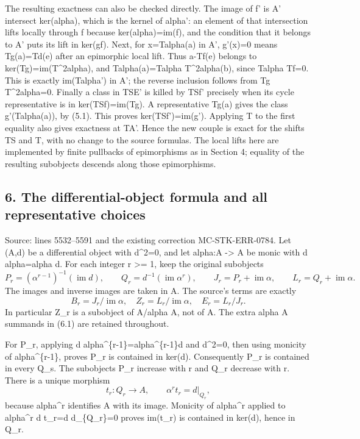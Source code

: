 The resulting exactness can also be checked directly. The image of f' is A' intersect ker(alpha), which is the kernel of alpha': an element of that intersection lifts locally through f because ker(alpha)=im(f), and the condition that it belongs to A' puts its lift in ker(gf). Next, for x=Talpha(a) in A', g'(x)=0 means Tg(a)=Td(e) after an epimorphic local lift. Thus a-Tf(e) belongs to ker(Tg)=im(T\^{}2alpha), and Talpha(a)=Talpha T\^{}2alpha(b), since Talpha Tf=0. This is exactly im(Talpha') in A'; the reverse inclusion follows from Tg T\^{}2alpha=0. Finally a class in TSE' is killed by TSf' precisely when its cycle representative is in ker(TSf)=im(Tg). A representative Tg(a) gives the class g'(Talpha(a)), by (5.1). This proves ker(TSf')=im(g'). Applying T to the first equality also gives exactness at TA'. Hence the new couple is exact for the shifts TS and T, with no change to the source formulas. The local lifts here are implemented by finite pullbacks of epimorphisms as in Section 4; equality of the resulting subobjects descends along those epimorphisms.

\subsection{6. The differential-object formula and all representative choices}\label{note-05-the-differential-object-formula-and-all-representative-choices}

Source: lines 5532--5591 and the existing correction MC-STK-ERR-0784. Let (A,d) be a differential object with d\^{}2=0, and let alpha:A -\textgreater{} A be monic with d alpha=alpha d. For each integer r \textgreater= 1, keep the original subobjects \[
P_r=(\alpha^{r-1})^{-1}(\operatorname{im}d),\qquad
Q_r=d^{-1}(\operatorname{im}\alpha^r),\qquad
J_r=P_r+\operatorname{im}\alpha,\qquad
L_r=Q_r+\operatorname{im}\alpha.                           \tag{6.1}
\] The images and inverse images are taken in A. The source's terms are exactly \[
B_r=J_r/\operatorname{im}\alpha,\quad
Z_r=L_r/\operatorname{im}\alpha,\quad
E_r=L_r/J_r.                                             \tag{6.2}
\] In particular Z\_r is a subobject of A/alpha A, not of A. The extra alpha A summands in (6.1) are retained throughout.

For P\_r, applying d alpha\^{}\{r-1\}=alpha\^{}\{r-1\}d and d\^{}2=0, then using monicity of alpha\^{}\{r-1\}, proves P\_r is contained in ker(d). Consequently P\_r is contained in every Q\_s. The subobjects P\_r increase with r and Q\_r decrease with r. There is a unique morphism \[
t_r:Q_r\longrightarrow A,\qquad
\alpha^r t_r=d|_{Q_r},                                   \tag{6.3}
\] because alpha\^{}r identifies A with its image. Monicity of alpha\^{}r applied to alpha\^{}r d t\_r=d d\textbar\_\{Q\_r\}=0 proves im(t\_r) is contained in ker(d), hence in Q\_r.

